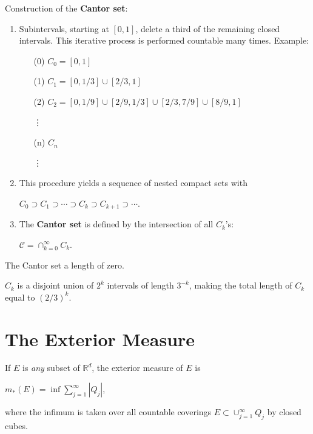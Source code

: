 \documentclass{book}
\newcommand{\RR}{\mathbb R}
\newcommand{\cc}{\mathcal{C}}
\begin{document}
Construction of the \textbf{Cantor set}:
\begin{enumerate}
    \item Subintervals, starting at $[0,1]$, delete a third of the remaining closed intervals. This iterative process is performed countable many times. Example:
\begin{enumerate}
    \item[(0)] $C_0=[0,1]$
    \item[(1)] $C_1=[0,1/3]\cup[2/3,1]$
    \item[(2)] $C_2=[0,1/9]\cup[2/9,1/3]\cup[2/3,7/9]\cup[8/9,1]$
    
    \hspace{5pt}\vdots
    \item[(n)] $C_n$
     
    \hspace{5pt}\vdots 
\end{enumerate}
    \item This procedure yields a sequence of nested compact sets with
    \begin{center}
        $C_0\supset C_1\supset\cdots\supset C_k \supset C_{k+1}\supset\cdots$.
    \end{center}
    \item The \textbf{Cantor set} is defined by the intersection of all $C_k$'s:
    \begin{center}
        $\cc=\cap_{k=0}^{\infty}C_k$.
    \end{center}
\end{enumerate}

The Cantor set a length of zero.

$C_k$ is a disjoint union of $2^k$ intervals of length $3^{-k}$, making the total length of $C_k$ equal to $(2/3)^k$.

\section{The Exterior Measure}
If $E$ is \textit{any} subset of $\RR^d$, the exterior measure of $E$ is 
\begin{center}
    $m_*(E)=\inf\sum_{j=1}^\infty |Q_j|$,
\end{center}
where the infimum is taken over all countable coverings $E\subset\cup_{j=1}^\infty Q_j$ by closed cubes.
\end{document}
